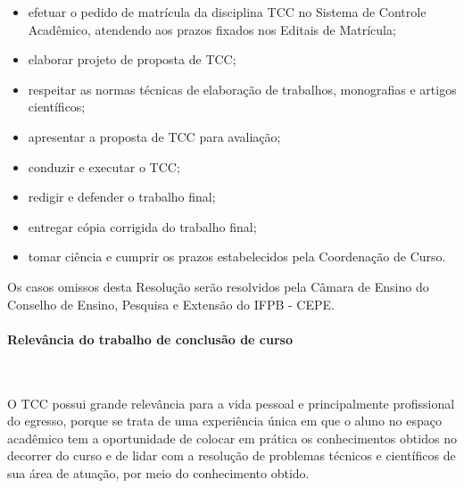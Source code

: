 \begin{itemize}
	\item efetuar o pedido de matrícula da disciplina TCC no Sistema de Controle Acadêmico, atendendo aos prazos fixados nos Editais de Matrícula; 

	\item elaborar projeto de proposta de TCC;

	\item respeitar as normas técnicas de elaboração de trabalhos, monografias e artigos científicos; 

	\item apresentar a proposta de TCC para avaliação; 

	\item conduzir e executar o TCC; 

	\item redigir e defender o trabalho final; 

	\item entregar cópia corrigida do trabalho final; 

	\item tomar ciência e cumprir os prazos estabelecidos pela Coordenação de Curso. 
\end{itemize}

Os casos omissos desta Resolução serão resolvidos pela Câmara de Ensino do Conselho de Ensino, Pesquisa e Extensão do IFPB - CEPE. 

\paragraph{Relevância do trabalho de conclusão de curso}\
 
       O TCC possui grande relevância para a vida pessoal e principalmente profissional do egresso, porque se trata de uma experiência única em que o aluno no espaço acadêmico tem a oportunidade de colocar em prática os conhecimentos obtidos no decorrer do curso e de lidar com a resolução de problemas técnicos e científicos de sua área de atuação, por meio do conhecimento obtido.


